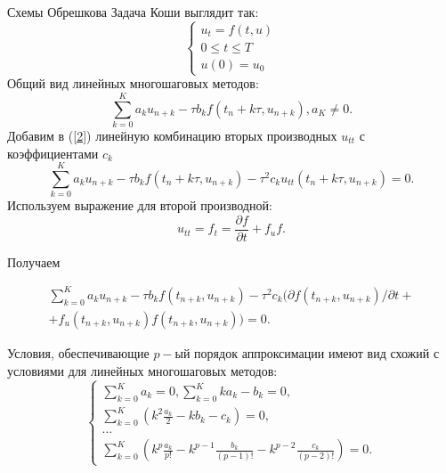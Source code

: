 \documentclass[ignorenonframetext,unicode,handout, 9pt]{beamer}
\begin{document}
\begin{frame}[t]{Схемы Обрешкова}
Задача Коши выглядит так:
\begin{equation}
\label{ZK}
 \begin{cases}
   u_t = f(t,u)\\
   0 \leqslant t \leqslant T \\
   u(0) = u_0
 \end{cases}
\end{equation}
Общий вид линейных  многошаговых методов:
\begin{equation}\label{2}
\sum\limits_{k=0}^{K}a_k u_{n+k} - \tau b_k f(t_n + k \tau, u_{n+k}), a_K \ne 0.
\end{equation}
Добавим  в (\ref{2}) линейную комбинацию вторых производных $u_{tt}$ с коэффициентами $c_k$
\begin{equation}\label{3}
\sum\limits_{k=0}^{K}a_k u_{n+k} - \tau b_k f(t_n + k \tau, u_{n+k}) - \tau^2 c_k  u_{tt}(t_n + k \tau, u_{n+k}) = 0.
\end{equation}
Используем  выражение для второй производной:
\begin{equation}\label{VP}
u_{tt} = f_t = \frac{\partial f}{\partial t} + f_u f.
\end{equation}

\end{frame}
\begin{frame}[t]

Получаем

\begin{eqnarray*} \sum\limits_{k=0}^{K}a_k u_{n+k} - \tau b_k f(t_{n+k}, u_{n+k}) - \tau^2 c_k (\partial f(t_{n+k},u_{n+k})/ \partial t + \\
   + f_u(t_{n+k},u_{n+k}) f(t_{n+k},u_{n+k})) = 0.
\end{eqnarray*}


Условия, обеспечивающие $p-$ый порядок аппроксимации имеют вид схожий с условиями для линейных многошаговых методов:
\begin{equation}
\label{UA}
 \begin{cases}
   \sum\limits_{k = 0}^{K} a_k = 0,  \sum\limits_{k = 0}^{K}k a_k - b_k = 0,\\
   \sum\limits_{k = 0}^{K} (k^2 \frac{a_k}{2} - k b_k - c_k) = 0 ,\\
    \ldots \\
     \sum\limits_{k = 0}^{K}( k^p \frac{a_k}{p!} - k^{p-1}\frac{ b_k}{(p-1)!} - k^{p-2} \frac{c_k}{(p-2)!} ) = 0.
 \end{cases}
\end{equation}

\end{frame}
\end{document}
